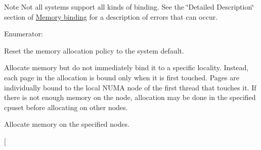 \begin{DoxyNote}{Note}
Not all systems support all kinds of binding. See the \char`\"{}Detailed Description\char`\"{} section of \hyperlink{a00050}{Memory binding} for a description of errors that can occur. 
\end{DoxyNote}
\begin{Desc}
\item[Enumerator: ]\par
\begin{description}
\item[{\em 
\hypertarget{a00050_ggac9764f79505775d06407b40f5e4661e8a18675bb80ebc1bce5b652e9de8f3998c}{
HWLOC\_\-MEMBIND\_\-DEFAULT}
\label{a00050_ggac9764f79505775d06407b40f5e4661e8a18675bb80ebc1bce5b652e9de8f3998c}
}]Reset the memory allocation policy to the system default. \item[{\em 
\hypertarget{a00050_ggac9764f79505775d06407b40f5e4661e8a979c7aa78dd32780858f30f47a72cca0}{
HWLOC\_\-MEMBIND\_\-FIRSTTOUCH}
\label{a00050_ggac9764f79505775d06407b40f5e4661e8a979c7aa78dd32780858f30f47a72cca0}
}]Allocate memory but do not immediately bind it to a specific locality. Instead, each page in the allocation is bound only when it is first touched. Pages are individually bound to the local NUMA node of the first thread that touches it. If there is not enough memory on the node, allocation may be done in the specified cpuset before allocating on other nodes. \item[{\em 
\hypertarget{a00050_ggac9764f79505775d06407b40f5e4661e8ad811fa4b2a6002c4d63695a408ffde2c}{
HWLOC\_\-MEMBIND\_\-BIND}
\label{a00050_ggac9764f79505775d06407b40f5e4661e8ad811fa4b2a6002c4d63695a408ffde2c}
}]Allocate memory on the specified nodes. \item[{\em 
}
\end{description}
\end{Desc}
